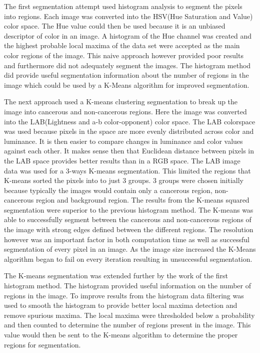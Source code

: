 \documentclass[letterpaper,10pt,oneside]{article}
\begin{document}
The first segmentation attempt used histogram analysis to segment the pixels into regions. Each image was converted into the HSV(Hue Saturation and Value) color space. The Hue value could then be used because it is an unbiased descriptor of color in an image. A histogram of the Hue channel was created and the highest probable local maxima of the data set were accepted as the main color regions of the image. This naive approach however provided poor results and furthermore did not adequately segment the images. The histogram method did provide useful segmentation information about the number of regions in the image which could be used by a K-Means algorithm for improved segmentation.

The next approach used a K-means clustering segmentation to break up the image into cancerous and non-cancerous regions. Here the image was converted into the LAB(Lightness and a-b color-opponent) color space. The LAB colorspace was used because pixels in the space are more evenly distributed across color and luminance. It is then easier to compare changes in luminance and color values against each other. It makes sense then that Euclidean distance between pixels in the LAB space provides better results than in a RGB space. The LAB image data was used for a 3-ways K-means segmentation. This limited the regions that K-means sorted the pixels into to just 3 groups. 3 groups were chosen initially because typically the images would contain only a cancerous region, non-cancerous region and background region. The results from the K-means squared segmentation were superior to the previous histogram method. The K-means was able to successfully segment between the cancerous and non-cancerous regions of the image with strong edges defined between the different regions. The resolution however was an important factor in both computation time as well as successful segmentation of every pixel in an image. As the image size increased the K-Means algorithm began to fail on every iteration resulting in unsuccessful segmentation.

The K-means segmentation was extended further by the work of the first histogram method. The histogram provided useful information on the number of regions in the image. To improve results from the histogram data filtering was used to smooth the histogram to provide better local maxima detection and remove spurious maxima. The local maxima were thresholded below a probability and then counted to determine the number of regions present in the image. This value would then be sent to the K-means algorithm to determine the proper regions for segmentation.
\end{document}
